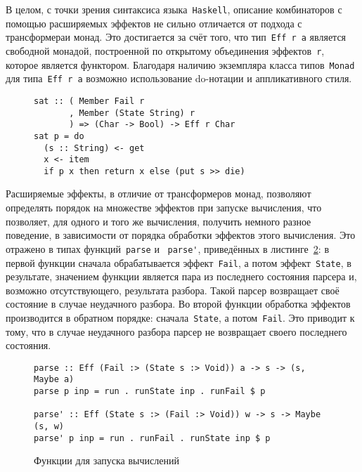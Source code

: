  В целом, с точки зрения синтаксиса языка~\lstinline{Haskell}, описание 
  комбинаторов с помощью расширяемых эффектов не сильно отличается от 
  подхода с трансформераи монад. Это достигается за счёт того, что 
  тип~\lstinline{Eff r a} является свободной монадой, построенной по открытому 
  объединения эффектов~\lstinline{r}, которое является функтором. Благодаря
  наличию экземпляра класса типов~\lstinline{Monad} для типа~\lstinline{Eff r a}
  возможно использование do-нотации и аппликативного стиля.

  \begin{figure}[h]
  \begin{lstlisting}
sat :: ( Member Fail r
       , Member (State String) r
       ) => (Char -> Bool) -> Eff r Char
sat p = do
  (s :: String) <- get
  x <- item
  if p x then return x else (put s >> die)
  \end{lstlisting}
  \label{listing:extEffSat}
  \end{figure} 

  Расширяемые эффекты, в отличие от трансформеров монад, позволяют определять 
  порядок на множестве эффектов при запуске вычисления, что позволяет, для 
  одного и того же вычисления, получить немного разное поведение, в зависимости от
  порядка обработки эффектов этого вычисления. Это отражено в 
  типах функций~\lstinline{parse} и ~\lstinline{parse'}, приведённых в 
  листинге~\ref{listing:extEffparse}: в первой функции сначала обрабатывается 
  эффект~\lstinline{Fail}, а потом эффект~\lstinline{State}, в результате, 
  значением функции является пара из последнего состояния парсера и, возможно 
  отсутствующего, результата разбора. Такой парсер возвращает своё состояние в 
  случае неудачного разбора. Во второй функции обработка эффектов 
  производится в обратном порядке: сначала~\lstinline{State}, а потом~\lstinline{Fail}.
  Это приводит к тому, что в случае неудачного разбора парсер не возвращает своего 
  последнего состояния. 

  \begin{figure}[h]
  \begin{lstlisting}
parse :: Eff (Fail :> (State s :> Void)) a -> s -> (s, Maybe a)
parse p inp = run . runState inp . runFail $ p

parse' :: Eff (State s :> (Fail :> Void)) w -> s -> Maybe (s, w)
parse' p inp = run . runFail . runState inp $ p 
  \end{lstlisting}
  \caption{Функции для запуска вычислений}
  \label{listing:extEffparse}
  \end{figure}

